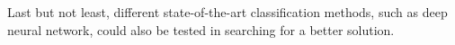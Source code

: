 \documentclass{article}
\begin{document}
Last but not least, different state-of-the-art classification methods, such as deep neural network, could also be tested in searching for a better solution.







%
%
%
%
\end{document}
